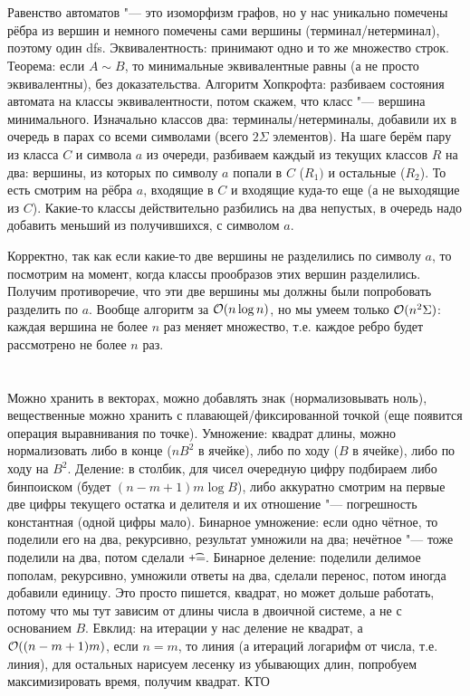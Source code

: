 \section{} %
Равенство автоматов "--- это изоморфизм графов, но у нас уникально помечены рёбра из вершин и немного помечены сами вершины (терминал/нетерминал), поэтому один dfs.
Эквивалентность: принимают одно и то же множество строк.
Теорема: если $A \sim B$, то минимальные эквивалентные равны (а не просто эквивалентны), без доказательства.
Алгоритм Хопкрофта: разбиваем состояния автомата на классы эквивалентности, потом скажем, что класс "--- вершина минимального.
Изначально классов два: терминалы/нетерминалы, добавили их в очередь в парах со всеми символами (всего $2\Sigma$ элементов).
На шаге берём пару из класса $C$ и символа $a$ из очереди, разбиваем каждый из текущих классов $R$ на два: вершины, из которых по символу $a$ попали в $C$ ($R_1)$ и остальные ($R_2$).
То есть смотрим на рёбра $a$, входящие в $C$ и входящие куда-то еще (а не выходящие из $C$).
Какие-то классы действительно разбились на два непустых, в очередь надо добавить меньший из получившихся, с символом $a$.

Корректно, так как если какие-то две вершины не разделились по символу $a$, то посмотрим на момент, когда классы прообразов этих вершин разделились.
Получим противоречие, что эти две вершины мы должны были попробовать разделить по $a$.
Вообще алгоритм за $\mathcal{O}(n \log n)$, но мы умеем только $\mathcal{O}(n^2\Sigma)$: каждая вершина не более $n$ раз меняет множество, т.е. каждое ребро будет рассмотрено не более $n$ раз.

\section{} %
Можно хранить в векторах, можно добавлять знак (нормализовывать ноль), вещественные можно хранить с плавающей/фиксированной точкой (еще появится операция выравнивания по точке).
Умножение: квадрат длины, можно нормализовать либо в конце ($nB^2$ в ячейке), либо по ходу ($B$ в ячейке), либо по ходу на $B^2$.
Деление: в столбик, для чисел очередную цифру подбираем либо бинпоиском (будет $(n-m+1)m\log B$), либо аккуратно смотрим на первые две цифры текущего остатка и делителя и их отношение "--- погрешность константная
(одной цифры мало).
Бинарное умножение: если одно чётное, то поделили его на два, рекурсивно, результат умножили на два; нечётное "--- тоже поделили на два, потом сделали \t{+=}.
Бинарное деление: поделили делимое пополам, рекурсивно, умножили ответы на два, сделали перенос, потом иногда добавили единицу.
Это просто пишется, квадрат, но может дольше работать, потому что мы тут зависим от длины числа в двоичной системе, а не с основанием $B$.
Евклид: на итерации у нас деление не квадрат, а $\mathcal{O}((n-m+1)m)$, если $n=m$, то линия (а итераций логарифм от числа, т.е. линия), для остальных нарисуем лесенку из убывающих длин, попробуем максимизировать время, получим квадрат.
\TODO КТО

